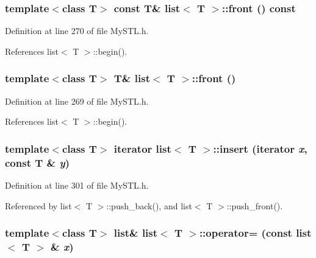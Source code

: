 \subsubsection[{front}]{\setlength{\rightskip}{0pt plus 5cm}template$<$class T$>$ const T\& {\bf list}$<$ T $>$::front () const}\label{classlist_a6ec857bb5edd04e45aec70e0dce83cf1}


Definition at line 270 of file MySTL.h.



References list$<$ T $>$::begin().

\subsubsection[{front}]{\setlength{\rightskip}{0pt plus 5cm}template$<$class T$>$ T\& {\bf list}$<$ T $>$::front ()}\label{classlist_a24aee7b6c85c63311f37ce807bf3598f}


Definition at line 269 of file MySTL.h.



References list$<$ T $>$::begin().

\subsubsection[{insert}]{\setlength{\rightskip}{0pt plus 5cm}template$<$class T$>$ {\bf iterator} {\bf list}$<$ T $>$::insert ({\bf iterator} {\em x}, \/  const T \& {\em y})}\label{classlist_a5ff2efab1931bc2857787e118b309e98}


Definition at line 301 of file MySTL.h.



Referenced by list$<$ T $>$::push\_\-back(), and list$<$ T $>$::push\_\-front().

\subsubsection[{operator=}]{\setlength{\rightskip}{0pt plus 5cm}template$<$class T$>$ {\bf list}\& {\bf list}$<$ T $>$::operator= (const {\bf list}$<$ T $>$ \& {\em x})}\label{classlist_a1d97b78ca649148987703343fab9c9f7}


